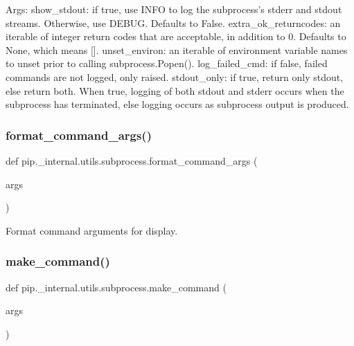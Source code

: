 \begin{DoxyVerb}Args:
  show_stdout: if true, use INFO to log the subprocess's stderr and
    stdout streams.  Otherwise, use DEBUG.  Defaults to False.
  extra_ok_returncodes: an iterable of integer return codes that are
    acceptable, in addition to 0. Defaults to None, which means [].
  unset_environ: an iterable of environment variable names to unset
    prior to calling subprocess.Popen().
  log_failed_cmd: if false, failed commands are not logged, only raised.
  stdout_only: if true, return only stdout, else return both. When true,
    logging of both stdout and stderr occurs when the subprocess has
    terminated, else logging occurs as subprocess output is produced.
\end{DoxyVerb}
 \mbox{\label{namespacepip_1_1__internal_1_1utils_1_1subprocess_a555d52c519beee42615b9db004f18d59}} 
\subsubsection{\texorpdfstring{format\+\_\+command\+\_\+args()}{format\_command\_args()}}
{\footnotesize\ttfamily def pip.\+\_\+internal.\+utils.\+subprocess.\+format\+\_\+command\+\_\+args (\begin{DoxyParamCaption}\item[{}]{args }\end{DoxyParamCaption})}

\begin{DoxyVerb}Format command arguments for display.
\end{DoxyVerb}
 \mbox{\label{namespacepip_1_1__internal_1_1utils_1_1subprocess_a315498638ac5b88744748fa91671c17a}} 
\subsubsection{\texorpdfstring{make\+\_\+command()}{make\_command()}}
{\footnotesize\ttfamily def pip.\+\_\+internal.\+utils.\+subprocess.\+make\+\_\+command (\begin{DoxyParamCaption}\item[{}]{args }\end{DoxyParamCaption})}

